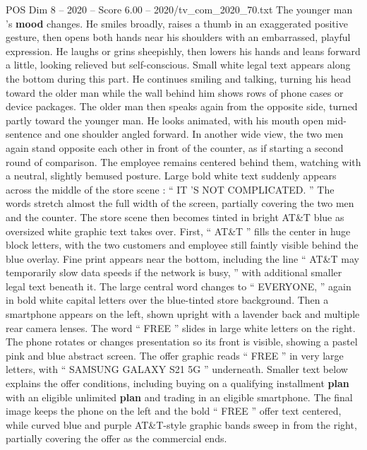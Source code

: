 \begin{textsample}{POS Dim 8 – 2020 – Score 6.00 – 2020/tv\_com\_2020\_70.txt}
The younger man ’s \textbf{mood} changes.
He smiles broadly, raises a thumb in an exaggerated positive gesture, then opens both hands near his shoulders with an embarrassed, playful expression.
He laughs or grins sheepishly, then lowers his hands and leans forward a little, looking relieved but self-conscious.
Small white legal text appears along the bottom during this part.
He continues smiling and talking, turning his head toward the older man while the wall behind him shows rows of phone cases or device packages.
The older man then speaks again from the opposite side, turned partly toward the younger man.
He looks animated, with his mouth open mid-sentence and one shoulder angled forward.
In another wide view, the two men again stand opposite each other in front of the counter, as if starting a second round of comparison.
The employee remains centered behind them, watching with a neutral, slightly bemused posture.
Large bold white text suddenly appears across the middle of the store scene : “ IT ’S NOT COMPLICATED. ” The words stretch almost the full width of the screen, partially covering the two men and the counter.
The store scene then becomes tinted in bright AT\&T blue as oversized white graphic text takes over.
First, “ AT\&T ” fills the center in huge block letters, with the two customers and employee still faintly visible behind the blue overlay.
Fine print appears near the bottom, including the line “ AT\&T may temporarily slow data speeds if the network is busy, ” with additional smaller legal text beneath it.
The large central word changes to “ EVERYONE, ” again in bold white capital letters over the blue-tinted store background.
Then a smartphone appears on the left, shown upright with a lavender back and multiple rear camera lenses.
The word “ FREE ” slides in large white letters on the right.
The phone rotates or changes presentation so its front is visible, showing a pastel pink and blue abstract screen.
The offer graphic reads “ FREE ” in very large letters, with “ SAMSUNG GALAXY S21 5G ” underneath.
Smaller text below explains the offer conditions, including buying on a qualifying installment \textbf{plan} with an eligible unlimited \textbf{plan} and trading in an eligible smartphone.
The final image keeps the phone on the left and the bold “ FREE ” offer text centered, while curved blue and purple AT\&T-style graphic bands sweep in from the right, partially covering the offer as the commercial ends.

\end{textsample}
